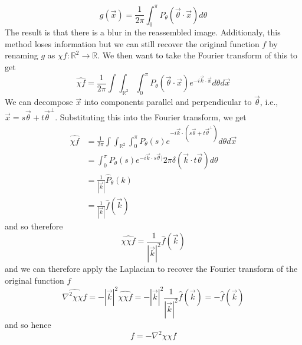 \documentclass{article}
\newcommand{\R}{\mathbb{R}}
\newcommand{\lap}{\nabla ^2}
\newcommand{\pull}{\!\!\!}
\theoremstyle{definition}
\begin{document}
\begin{equation*}
    g(\vec x) = \frac{1}{2\pi} \int_0^\pi P_\theta (\vec \theta \cdot \vec x) d\theta
\end{equation*}
The result is that there is a blur in the reassembled image. Additionaly, this method loses information but we can still recover the original function $f$ by renaming $g$ as $\chi f: \R^2 \to \R$. We then want to take the Fourier transform of this to get 
\begin{equation*}
    \widehat{\chi f} = \frac{1}{2\pi} \int \pull \int_{\R^2} \int^\pi_0 P_\theta (\vec \theta \cdot \vec x) e^{-i \vec k \cdot \vec x} d\theta d\vec x
\end{equation*}
We can decompose $\vec x$ into components parallel and perpendicular to $\vec \theta$, i.e., $\vec x = s \vec \theta + t \vec \theta ^\perp$. Substituting this into the Fourier transform, we get
\begin{align*}
    \widehat{\chi f} &= \frac{1}{2\pi} \int \pull \int_{\R^2} \int^\pi_0 P_\theta (s) e^{-i \vec k \cdot (s \vec \theta + t \vec \theta ^\perp)} d\theta d\vec x \\
    &= \int^\pi_0 P_\theta (s) e^{-i \vec k \cdot s \vec \theta )} 2\pi \delta (\vec k \cdot t\vec \theta) d\theta \\
    &= \frac{1}{\left|\vec k \right|}\hat P_\theta (k) \\&= \frac{1}{\left|\vec k \right|}\hat f (\vec k)
\end{align*}
and so therefore 
\begin{equation*}
    \widehat{\chi \chi f} = \frac{1}{\left|\vec k \right|^2} \hat f (\vec k)
\end{equation*}
and we can therefore apply the Laplacian to recover the Fourier transform of the original function $f$
\begin{equation*}
    \widehat{\lap \chi \chi f} = -\left|\vec k \right|^2 \widehat{\chi \chi f} = -\left|\vec k \right|^2 \frac{1}{\left|\vec k \right|^2} \hat f (\vec k) = -\hat f (\vec k)
\end{equation*}
and so hence 
\begin{equation*}
    f = -\lap \chi \chi f
\end{equation*}
\end{document}
